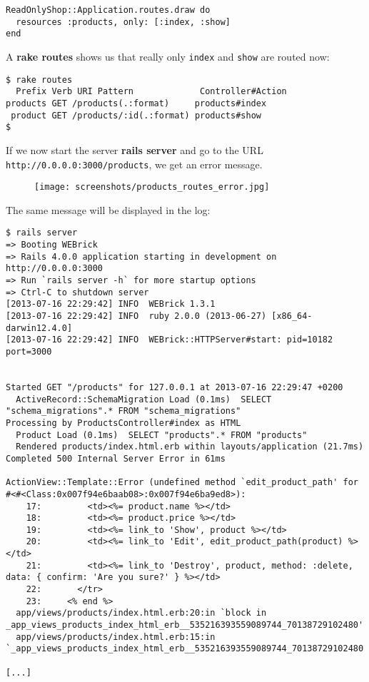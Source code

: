 \documentclass[a4paper]{book}
\begin{document}
\begin{shaded}\begin{verbatim}
ReadOnlyShop::Application.routes.draw do
  resources :products, only: [:index, :show]
end
\end{verbatim}\end{shaded}

A \textbf{rake routes} shows us that really only \texttt{index} and \texttt{show} are routed now:

\begin{shaded}\begin{verbatim}
$ rake routes
  Prefix Verb URI Pattern             Controller#Action
products GET /products(.:format)     products#index
 product GET /products/:id(.:format) products#show
$
\end{verbatim}\end{shaded}

If we now start the server \textbf{rails server} and go to the URL \texttt{http://0.0.0.0:3000/products}, we get an error message.

\begin{figure}[htbp]
\centering
\texttt{[image: screenshots/products\_routes\_error.jpg]}
\end{figure}

The same message will be displayed in the log:

\begin{shaded}\begin{verbatim}
$ rails server
=> Booting WEBrick
=> Rails 4.0.0 application starting in development on http://0.0.0.0:3000
=> Run `rails server -h` for more startup options
=> Ctrl-C to shutdown server
[2013-07-16 22:29:42] INFO  WEBrick 1.3.1
[2013-07-16 22:29:42] INFO  ruby 2.0.0 (2013-06-27) [x86_64-darwin12.4.0]
[2013-07-16 22:29:42] INFO  WEBrick::HTTPServer#start: pid=10182 port=3000


Started GET "/products" for 127.0.0.1 at 2013-07-16 22:29:47 +0200
  ActiveRecord::SchemaMigration Load (0.1ms)  SELECT "schema_migrations".* FROM "schema_migrations"
Processing by ProductsController#index as HTML
  Product Load (0.1ms)  SELECT "products".* FROM "products"
  Rendered products/index.html.erb within layouts/application (21.7ms)
Completed 500 Internal Server Error in 61ms

ActionView::Template::Error (undefined method `edit_product_path' for #<#<Class:0x007f94e6baab08>:0x007f94e6ba9ed8>):
    17:         <td><%= product.name %></td>
    18:         <td><%= product.price %></td>
    19:         <td><%= link_to 'Show', product %></td>
    20:         <td><%= link_to 'Edit', edit_product_path(product) %></td>
    21:         <td><%= link_to 'Destroy', product, method: :delete, data: { confirm: 'Are you sure?' } %></td>
    22:       </tr>
    23:     <% end %>
  app/views/products/index.html.erb:20:in `block in _app_views_products_index_html_erb__535216393559089744_70138729102480'
  app/views/products/index.html.erb:15:in `_app_views_products_index_html_erb__535216393559089744_70138729102480'

[...]
\end{verbatim}\end{shaded}
\end{document}
